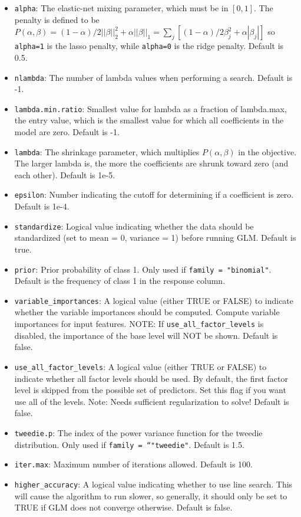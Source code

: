 \documentclass[11pt]{article}
\begin{document}
\begin{itemize}
\item \texttt{alpha}: The elastic-net mixing parameter, which must be in $[0,1]$. The penalty is defined to be $P(\alpha,\beta) = (1-\alpha)/2||\beta||_2^2 + \alpha||\beta||_1 = \sum_j [(1-\alpha)/2 \beta_j^2 + \alpha|\beta_j|] $ so \texttt{alpha=1} is the lasso penalty, while \texttt{alpha=0} is the ridge penalty. Default is 0.5.
\item \texttt{nlambda}: The number of lambda values when performing a search. Default is -1.
\item \texttt{lambda.min.ratio}: Smallest value for lambda as a fraction of lambda.max, the entry value, which is the smallest value for which all coefficients in the model are zero. Default is -1.
\item \texttt{lambda}: The shrinkage parameter, which multiplies $P(\alpha,\beta)$ in the objective. The larger lambda is, the more the coefficients are shrunk toward zero (and each other). Default is 1e-5.
\item \texttt{epsilon}: Number indicating the cutoff for determining if a coefficient is zero. Default is 1e-4.
\item \texttt{standardize}: Logical value indicating whether the data should be standardized (set to mean = 0, variance = 1) before running GLM. Default is true.
\item \texttt{prior}: Prior probability of class 1. Only used if \texttt{family = "binomial"}. Default is the frequency of class 1 in the response column. 
\item \texttt{variable\_importances}: A logical value (either TRUE or FALSE) to indicate whether the variable importances should be computed.  Compute variable importances for input features. NOTE: If \texttt{use\_all\_factor\_levels} is disabled,  the importance of the base level will NOT be shown. Default is false.
\item \texttt{use\_all\_factor\_levels}: A logical value (either TRUE or FALSE) to indicate whether all factor levels should be used. By default, the first factor level is skipped from the possible set of predictors. Set this flag if you want use all of the levels. Note: Needs sufficient regularization to solve! Default is false.
\item \texttt{tweedie.p}: The index of the power variance function for the tweedie distribution. Only used if \texttt{family = “"tweedie"}. Default is 1.5.
\item \texttt{iter.max}: Maximum number of iterations allowed. Default is 100.
\item \texttt{higher\_accuracy}: A logical value indicating whether to use line search. This will cause the algorithm to run slower, so generally, it should only be set to TRUE if GLM does not converge otherwise. Default is false.

\end{itemize}
\end{document}
